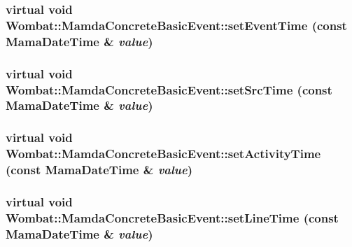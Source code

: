 \hypertarget{classWombat_1_1MamdaConcreteBasicEvent_2ad4b9650759b80a06c75e3ab486d776}{
\subsubsection[setEventTime]{\setlength{\rightskip}{0pt plus 5cm}virtual void Wombat::Mamda\-Concrete\-Basic\-Event::set\-Event\-Time (const Mama\-Date\-Time \& {\em value})}}
\label{classWombat_1_1MamdaConcreteBasicEvent_2ad4b9650759b80a06c75e3ab486d776}


\hypertarget{classWombat_1_1MamdaConcreteBasicEvent_0ba82f07a5d02c9a93b1bdeb5204f334}{
\subsubsection[setSrcTime]{\setlength{\rightskip}{0pt plus 5cm}virtual void Wombat::Mamda\-Concrete\-Basic\-Event::set\-Src\-Time (const Mama\-Date\-Time \& {\em value})}}
\label{classWombat_1_1MamdaConcreteBasicEvent_0ba82f07a5d02c9a93b1bdeb5204f334}


\hypertarget{classWombat_1_1MamdaConcreteBasicEvent_cddf0f856acdf264ac9ed48d1818d9fd}{
\subsubsection[setActivityTime]{\setlength{\rightskip}{0pt plus 5cm}virtual void Wombat::Mamda\-Concrete\-Basic\-Event::set\-Activity\-Time (const Mama\-Date\-Time \& {\em value})}}
\label{classWombat_1_1MamdaConcreteBasicEvent_cddf0f856acdf264ac9ed48d1818d9fd}


\hypertarget{classWombat_1_1MamdaConcreteBasicEvent_29e2aec03dac7c70700e06fb075f45e4}{
\subsubsection[setLineTime]{\setlength{\rightskip}{0pt plus 5cm}virtual void Wombat::Mamda\-Concrete\-Basic\-Event::set\-Line\-Time (const Mama\-Date\-Time \& {\em value})}}
\label{classWombat_1_1MamdaConcreteBasicEvent_29e2aec03dac7c70700e06fb075f45e4}


